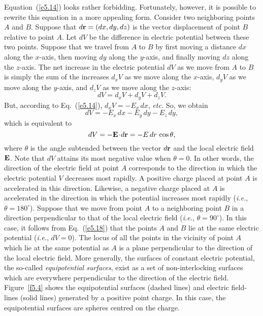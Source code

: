 Equation~(\ref{e5.14}) looks rather forbidding. Fortunately, however, it is possible
to rewrite this equation in a more appealing form. Consider two neighboring
points $A$ and $B$. Suppose that $d{\bf r}  = (dx, dy,
dz)$ is the vector displacement of point $B$ relative to point $A$. 
 Let $dV$ be the difference in electric potential
between these two points. 
Suppose that we travel from $A$ to $B$ by first moving a distance $dx$
along the $x$-axis, then moving $dy$ along the $y$-axis,
and finally moving $dz$ along the $z$-axis. The net  increase 
in the electric potential $dV$ as we move from $A$ to $B$ 
is simply the sum of the increases $d_x V$ as we move along the $x$-axis,
$d_y V$ as we move along the $y$-axis, and $d_z V$ as we move along the $z$-axis:
\begin{equation}
dV = d_x V + d_y V + d_z V.
\end{equation}
But, according to Eq.~(\ref{e5.14}), $d_x V =- E_x\,dx$, {\em etc.}
So, we obtain
\begin{equation}
dV =- E_x\,dx - E_y \,dy -E_z\,dy,
\end{equation}
which is equivalent to 
\begin{equation}\label{e5.18}
dV = -{\bf E}\!\cdot\! d{\bf r}= -E\,dr \,\cos\theta,
\end{equation}
where $\theta$ is the angle subtended between the vector $d{\bf r}$ and
the local electric field ${\bf E}$. Note that $dV$ attains
its most negative value when $\theta=0$. In other words, the direction of the
electric field at point $A$ corresponds to the direction in which the electric
potential $V$ decreases most rapidly. A positive charge placed at point $A$
is accelerated in this direction. Likewise, a negative charge placed at $A$ is
accelerated in the direction in which the potential increases most rapidly
({\em i.e.}, $\theta = 180^\circ$). Suppose that we move from point $A$ to a neighboring point
$B$ in a direction perpendicular to that of the local electric
field ({\em i.e.}, $\theta = 90^\circ$). In this case, it follows from Eq.~(\ref{e5.18}) that the  points $A$ and $B$ lie at the same electric potential ({\em i.e.}, $dV=0$). The locus of all the points in the vicinity of point $A$ which lie at the
same potential as $A$ is  a plane perpendicular to the direction of the
local  electric
field. More generally, the surfaces of constant electric potential, the so-called
{\em equipotential surfaces}, exist as a set of non-interlocking surfaces which are
everywhere perpendicular to the direction of the electric field. Figure~\ref{f5.4} shows the
equipotential surfaces (dashed lines) and electric field-lines (solid lines)
generated by a positive point charge. In this case, the equipotential surfaces are
spheres centred on the charge. 

